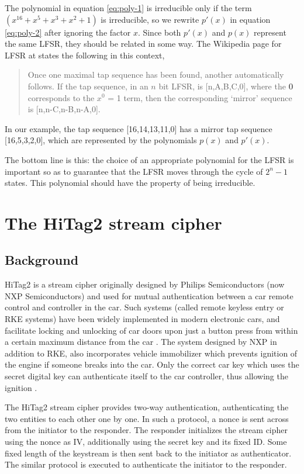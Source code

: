 The polynomial in equation \ref{eq:poly-1} is irreducible only if the term $(x^{16} + x^{5} + x^{3} + x^{2} + 1)$ is irreducible, so we rewrite $p'(x)$ in equation \ref{eq:poly-2} after ignoring the factor $x$. Since both $p'(x)$ and $p(x)$ represent the same LFSR, they should be related in some way. The Wikipedia page for LFSR at \cite{lfsr-wiki} states the following in this context,

\begin{quote}
\footnotesize{
Once one maximal tap sequence has been found, another automatically follows. If the tap sequence, in an $n$ bit LFSR, is [n,A,B,C,0], where the \textbf{0} corresponds to the $x^0$ = 1 term, then the corresponding `mirror' sequence is [n,n-C,n-B,n-A,0].}
\end{quote}

In our example, the tap sequence [16,14,13,11,0] has a mirror tap sequence [16,5,3,2,0], which are represented by the polynomials $p(x)$ and $p'(x)$.

The bottom line is this: the choice of an appropriate polynomial for the LFSR is important so as to guarantee that the LFSR moves through the cycle of $2^n-1$ states. This polynomial should have the property of being irreducible.

\section{The HiTag2 stream cipher}
\label{sec:hitag2}

\subsection{Background}
\label{sec:hitag2-background}
HiTag2 is a stream cipher originally designed by Philips Semiconductors (now NXP Semiconductors) and used for mutual authentication between a car remote control and controller in the car. Such systems (called remote keyless entry or RKE systems) have been widely implemented in modern electronic cars, and facilitate locking and unlocking of car doors upon just a button press from within a certain maximum distance from the car \cite{rke-wiki}. The system designed by NXP in addition to RKE, also incorporates vehicle immobilizer which prevents ignition of the engine if someone breaks into the car. Only the correct car key which uses the secret digital key can authenticate itself to the car controller, thus allowing the ignition \cite{rke-nxp}.

The HiTag2 stream cipher provides two-way authentication, authenticating the two entities to each other one by one. In such a protocol, a nonce is sent across from the initiator to the responder. The responder initializes the stream cipher using the nonce as IV, additionally using the secret key and its fixed ID. Some fixed length of the keystream is then sent back to the initiator as authenticator. The similar protocol is executed to authenticate the initiator to the responder. 

